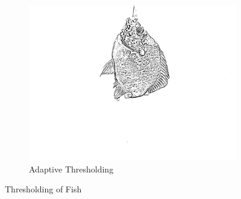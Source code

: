 \begin{figure}[H]
\begin{subfigure}{.33\textwidth}
        \centering
        \includegraphics[width=.99\linewidth]{images/literature/thresholding/fish_adaptive_thresholding}
        \caption{Adaptive Thresholding}
    \end{subfigure}
    \caption{Thresholding of Fish}
    \label{fig:fish_threshold}
\end{figure}



